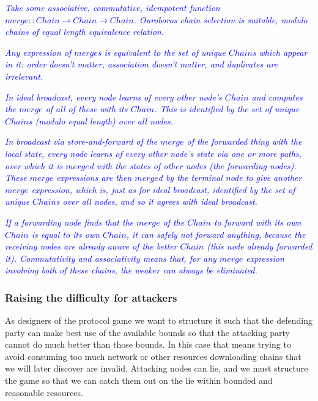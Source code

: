\documentclass{article}
\newcommand{\avieth}[1]{\textcolor{blue}{\emph{#1}}}
\theoremstyle{definition}{
  \newtheorem{lemma}{Lemma}[section] %
  \newtheorem{definition}[lemma]{Definition}
}
\theoremstyle{theorem}{
  \newtheorem{invariant}[lemma]{Invariant}
  \newtheorem{proofobligation}[lemma]{Proof Obligation}
}
\numberwithin{equation}{lemma}
\begin{document}
  \avieth{Take some associative, commutative, idempotent function
    $merge :: Chain \rightarrow Chain \rightarrow Chain$.
    Ouroboros chain selection is suitable,
    modulo chains of equal length equivalence relation.}

  \avieth{Any expression of $merge$s is equivalent to the set of unique $Chain$s
    which appear in it: order doesn't matter, association doesn't matter, and
    duplicates are irrelevant.}

  \avieth{In ideal broadcast, every node learns of every other node's $Chain$
    and computes the $merge$ of all of these with its $Chain$. This is
    identified by the set of unique $Chain$s (modulo equal length) over all
    nodes.}

  \avieth{In broadcast via store-and-forward of the $merge$ of the forwarded
    thing with the local state, every node learns of every other node's state
    via one or more paths, over which it is $merge$d with the states of other
    nodes (the forwarding nodes). These $merge$ expressions are then $merge$d
    by the terminal node to give another $merge$ expression, which is, just as
    for ideal broadcast, identified by the set of unique $Chain$s over all
    nodes, and so it agrees with ideal broadcast.}

  \avieth{If a forwarding node finds that the $merge$ of the $Chain$ to forward
    with its own $Chain$ is equal to its own $Chain$, it can safely not forward
    anything, because the receiving nodes are already aware of the better
    $Chain$ (this node already forwarded it). Commutativity and associativity
    means that, for any $merge$ expression involving both of these chains, the
    weaker can always be eliminated.\\}


\subsubsection{Raising the difficulty for attackers}

As designers of the protocol game we want to structure it such that the
defending party can make best use of the available bounds so that the attacking
party cannot do much better than those bounds. In this case that means trying
to avoid consuming too much network or other resources downloading chains that
we will later discover are invalid. Attacking nodes can lie, and we must
structure the game so that we can catch them out on the lie within bounded and
reasonable resources.
\end{document}
